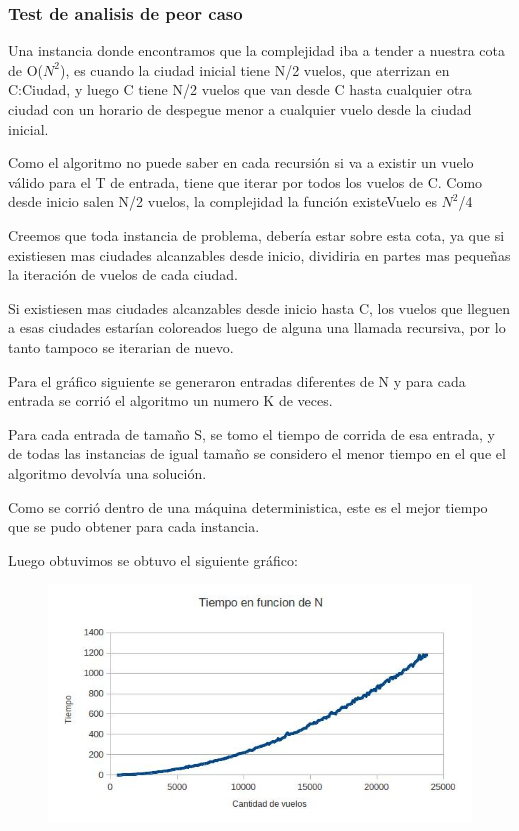 \subsubsection{Test de analisis de peor caso}

Una instancia donde encontramos que la complejidad iba a tender a nuestra cota de O($N^{2}$), es cuando la ciudad inicial tiene N/2 vuelos, que aterrizan en C:Ciudad, y luego C tiene N/2 vuelos que van desde C hasta cualquier otra ciudad con un horario de despegue menor a cualquier vuelo desde la ciudad inicial.

Como el algoritmo no puede saber en cada recursi\'on si va a existir un vuelo v\'alido para el T de entrada, tiene que iterar por todos los vuelos de C. Como desde inicio salen N/2 vuelos, la complejidad la funci\'on existeVuelo es $N^{2}$/4

Creemos que toda instancia de problema, deber\'ia estar sobre esta cota, ya que si existiesen mas ciudades alcanzables desde inicio, dividiria en partes mas pequeñas la iteraci\'on de vuelos de cada ciudad.

Si existiesen mas ciudades alcanzables desde inicio hasta C, los vuelos que lleguen a esas ciudades estar\'ian coloreados luego de alguna una llamada recursiva, por lo tanto tampoco se iterarian de nuevo.

Para el gr\'afico siguiente se generaron entradas diferentes de N y para cada entrada se corri\'o el algoritmo un numero K de veces.

Para cada entrada de tamaño S, se tomo el tiempo de corrida de esa entrada, y de todas las instancias de igual tamaño se considero el menor tiempo en el que el algoritmo devolv\'ia una soluci\'on.

Como se corri\'o dentro de una m\'aquina deterministica, este es el mejor tiempo que se pudo obtener para cada instancia. 

Luego obtuvimos se obtuvo el siguiente gr\'afico:

\begin{figure}[ht]
	\begin{minipage}[t]{\linewidth}
		\centering
		\includegraphics[width=\textwidth]{GraficoDeVuelosYTiempo.jpg}
	\end{minipage}	
\end{figure}

